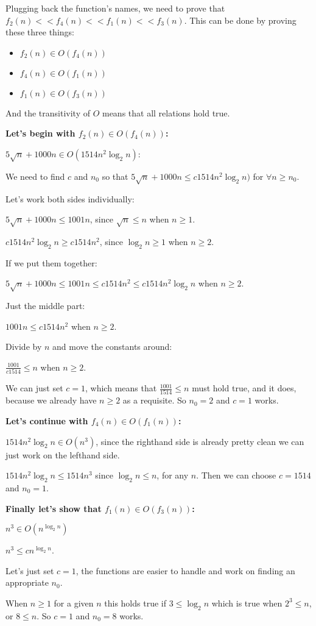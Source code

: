 Plugging back the function's names, we need to prove that $f_2(n) << f_4(n) << f_1(n) << f_3(n)$. This can be done by proving these three things:

\begin{itemize}
    \item $f_2(n) \in O(f_4(n))$
    \item $f_4(n) \in O(f_1(n))$
    \item $f_1(n) \in O(f_3(n))$
\end{itemize}

And the transitivity of $O$ means that all relations hold true.

\textbf{Let's begin with $f_2(n) \in O(f_4(n))$:}

$5\sqrt{n} + 1000n \in O(1514n^{2}\log_{2}n)$:

We need to find $c$ and $n_0$ so that
$5\sqrt{n} + 1000n \leq{} c1514n^{2}\log_{2}n)$ for $\forall{}n\geq{}n_0$.

Let's work both sides individually:

$5\sqrt{n} + 1000n \leq{} 1001n$, since $\sqrt{n} \leq{} n$ when $n\geq{}1$.

$c1514n^{2}\log_{2}n \geq{} c1514n^{2}$, since $\log_2{n} \geq{} 1$ when $n\geq{}2$.

If we put them together:

$5\sqrt{n} + 1000n \leq{} 1001n \leq{} c1514n^{2} \leq{} c1514n^{2}\log_{2}n$ when $n\geq{}2$.

Just the middle part:

$1001n \leq{} c1514n^{2}$ when $n\geq{}2$.

Divide by $n$ and move the constants around:

$\frac{1001}{c1514} \leq{} n$ when $n\geq{}2$.

We can just set $c=1$, which means that $\frac{1001}{1514} \leq{} n$ must hold true, and it does, because we already have $n\geq{}2$ as a requisite. So $n_0=2$ and $c=1$ works.

\textbf{Let's continue with $f_4(n) \in O(f_1(n))$:}

$1514n^{2}\log_{2}n \in{} O(n^3)$, since the righthand side is already pretty clean we can just work on the lefthand side.

$1514n^{2}\log_{2}n \leq{} 1514n^3$ since $\log_{2}n\leq{}n$, for any $n$. Then we can choose $c=1514$ and $n_0=1$.

\textbf{Finally let's show that $f_1(n) \in O(f_3(n))$:}

$n^3 \in{} O(n^{\log_{2}n})$

$n^3 \leq{} cn^{\log_{2}n}$.

Let's just set $c=1$, the functions are easier to handle and work on finding an appropriate $n_0$.

When $n\geq{}1$ for a given $n$ this holds true if $3 \leq{} \log_{2}n$ which is true when $2^3 \leq{} n$, or $8 \leq{} n$. So $c=1$ and $n_0 = 8$ works.